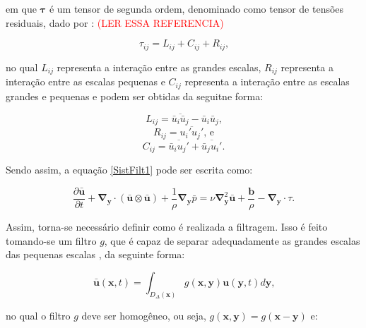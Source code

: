 \documentclass[_ArquivoPrincipal.tex]{subfiles}
\begin{document}
\noindent em que $\mathbf{\tau}$ é um tensor de segunda ordem, denominado como tensor de tensões residuais, dado por \cite{leonard1975energy}: \textcolor{red}{(LER ESSA REFERENCIA)}

\begin{equation}
    \tau_{ij}=L_{ij}+C_{ij}+R_{ij}\text{,}
    \label{TensRes}
\end{equation}

\noindent no qual $L_{ij}$ representa a interação entre as grandes escalas, $R_{ij}$ representa a interação entre as escalas pequenas e $C_{ij}$ representa a interação entre as escalas grandes e pequenas e podem ser obtidas da seguitne forma:

\begin{equation}
    L_{ij}=\overline{\bar{u}_i\bar{u}_j}-\bar{u}_i\bar{u}_j\text{,}
    \label{Lij}
\end{equation}
\begin{equation}
    R_{ij}=\overline{u_i'u_j'}\text{, e}
    \label{Cij}
\end{equation}
\begin{equation}
    C_{ij}=\overline{\bar{u}_iu_j'}+\overline{\bar{u}_ju_i'}\text{.}
    \label{Rij}
\end{equation}

Sendo assim, a equação \ref{SistFilt1} pode ser escrita como:

\begin{equation}
    \frac{\partial\bar{\mathbf{u}}}{\partial t}+\mathbf{\nabla}_\mathbf{y}\cdot{(\bar{\mathbf{u}}\otimes\bar{\mathbf{u}})}+\frac{1}{\rho}\mathbf{\nabla}_\mathbf{y}\bar{p}=\nu\mathbf{\nabla}^2_\mathbf{y}\bar{\mathbf{u}}+\frac{\mathbf{b}}{\rho}-\mathbf{\nabla}_\mathbf{y}\cdot\tau\text{.}
    \label{EqFiltrada}
\end{equation}

Assim, torna-se necessário definir como é realizada a filtragem. Isso é feito tomando-se um filtro $g$, que é capaz de separar adequadamente as grandes escalas das pequenas escalas \cite{hughes2000large}, da seguinte forma:

\begin{equation}
    \bar{\mathbf{u}}(\mathbf{x},t)=\int_{D_\Delta(\mathbf{x})}{g(\mathbf{x},\mathbf{y})\mathbf{u}(\mathbf{y},t)d\mathbf{y}}\text{,}
    \label{Filtro1}
\end{equation}

\noindent no qual o filtro $g$ deve ser homogêneo, ou seja, $g(\mathbf{x},\mathbf{y})=g(\mathbf{x}-\mathbf{y})$ e:
\end{document}
